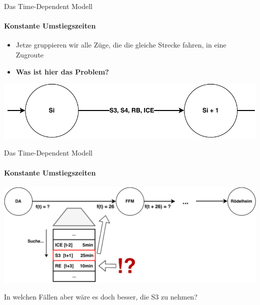\begin{frame}{Das Time-Dependent Modell}
	\framesubtitle{Konstante Umstiegszeiten}
	\begin{itemize}
		\item Jetze gruppieren wir alle Züge, die die gleiche Strecke fahren, in eine Zugroute
		\item \textbf{Was ist hier das Problem?}
	\end{itemize}
	
	\begin{center}
		\includegraphics[width=\linewidth]{images/time-dependent/zugroute-problem.pdf}
	\end{center}
\end{frame}


\begin{frame}{Das Time-Dependent Modell}
	\framesubtitle{Konstante Umstiegszeiten}

	\begin{center}
		\includegraphics[width=.98\linewidth]{images/time-dependent/zugroute-problem-beispiel.pdf}
	\end{center}
	\vspace{2em}
	\pause
	\begin{block}{}
		In welchen Fällen aber wäre es doch besser, die S3 zu nehmen?
	\end{block}
\end{frame}


